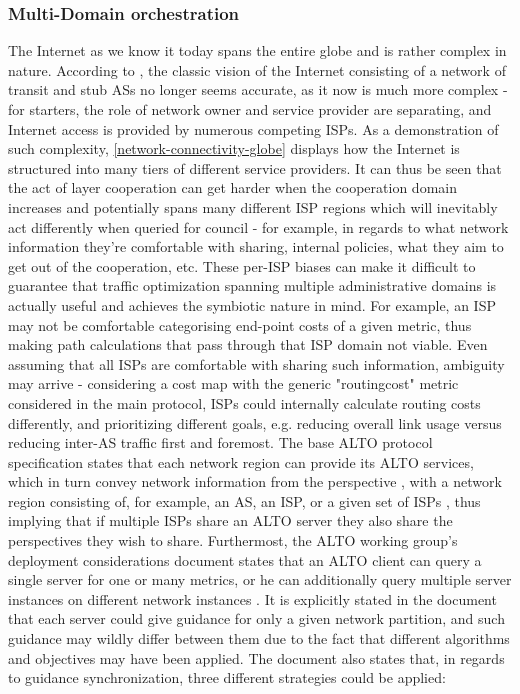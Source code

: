 \subsubsection{Multi-Domain orchestration}
    The Internet as we know it today spans the entire globe and is rather complex in nature.
    According to \cite{dan-Commag10}, the classic vision of the Internet consisting of a network of transit and stub ASs no longer seems accurate, as it now is much more complex - for starters, the role of network owner and service provider are separating, and Internet access is provided by numerous competing ISPs.
    As a demonstration of such complexity, \ref{network-connectivity-globe} displays how the Internet is structured into many tiers of different service providers.
    It can thus be seen that the act of layer cooperation can get harder when the cooperation domain increases and potentially spans many different ISP regions which will inevitably act differently when queried for council - for example, in regards to what network information they're comfortable with sharing, internal policies, what they aim to get out of the cooperation, etc.
    These per-ISP biases can make it difficult to guarantee that traffic optimization spanning multiple administrative domains is actually useful and achieves the symbiotic nature in mind.
    For example, an ISP may not be comfortable categorising end-point costs of a given metric, thus making path calculations that pass through that ISP domain not viable.
    Even assuming that all ISPs are comfortable with sharing such information, ambiguity may arrive - considering a cost map with the generic "routingcost" metric considered in the main protocol, ISPs could internally calculate routing costs differently, and prioritizing different goals, e.g. reducing overall link usage versus reducing inter-AS traffic first and foremost.
    The base ALTO protocol specification states that each network region can provide its ALTO services, which in turn convey network information from the perspective , with a network region consisting of, for example, an AS, an ISP, or a given set of ISPs \cite{alto-protocol}, thus implying that if multiple ISPs share an ALTO server they also share the perspectives they wish to share.
    Furthermost, the ALTO working group's deployment considerations document states that an ALTO client can query a single server for one or many metrics, or he can additionally query multiple server instances on different network instances \cite{alto-deployment-considerations}. It is explicitly stated in the document that each server could give guidance for only a given network partition, and such guidance may wildly differ between them due to the fact that different algorithms and objectives may have been applied.
    The document also states that, in regards to guidance synchronization, three different strategies could be applied:

